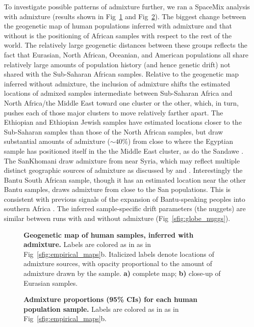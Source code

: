 \documentclass[10pt,letterpaper]{article}
\begin{document}
To investigate possible patterns of admixture further, we ran a SpaceMix analysis with admixture (results shown in Fig\ \ref{sfig:globe_ad_maps} and Fig\ \ref{globe_ad_props}). The biggest change between the geogenetic map of human populations inferred with admixture and that without is the positioning of African samples with respect to the rest of the world.  The relatively large geogenetic distances between these groups reflects the fact that Eurasian, North African, Oceanian, and American populations all share relatively large amounts of population history (and hence genetic drift) not shared with the Sub-Saharan African samples. Relative to the geogenetic map inferred without admixture, the inclusion of admixture shifts the estimated locations of admixed samples intermediate between Sub-Saharan Africa and North Africa/the Middle East toward one cluster or the other, which, in turn, pushes each of those major clusters to move relatively farther apart.  The Ethiopian and Ethiopian Jewish samples have estimated locations closer to the Sub-Saharan samples than those of the North African samples, but draw substantial amounts of admixture ($\sim 40\%$) from close to where the Egyptian sample has positioned itself in the the Middle East cluster, as do the Sandawe \cite{hodgson_early_2014,Pickrell:12}. 
The SanKhomani draw admixture from near Syria, which may reflect multiple distinct geographic sources of admixture as discussed by \cite{Hellenthal} and \cite{Pickrell:14}. 
Interestingly the Bantu South African sample, though it has an estimated location near the other Bantu samples, draws admixture from close to the San populations. This is consistent with previous signals of the expansion of Bantu-speaking peoples into southern Africa  \cite{Pickrell:12,Jakobsson_genomic_2012,Pickrell:14,Hellenthal}.  The inferred sample-specific drift parameters (the nuggets) are similar between runs with and without admixture (Fig\ \ref{sfig:globe_nuggs}).
%
\begin{figure}[ht!]
\begin{center}
\end{center}
\caption{
\textbf{Geogenetic map of human samples, inferred with admixture.} 
Labels are colored as in as in Fig\ \ref{sfig:empirical_maps}b.
Italicized labels denote locations of admixture sources, 
with opacity proportional to the amount of admixture drawn by the sample.
	\textbf{a)} complete map; 
	\textbf{b)} close-up of Eurasian samples.
}\label{sfig:globe_ad_maps}
\end{figure}
%
\begin{figure}[ht!]
\begin{center}
\end{center}
\caption{
\textbf{Admixture proportions (95\% CIs) for each human population sample.}
Labels are colored as in as in Fig\ \ref{sfig:empirical_maps}b.
}\label{globe_ad_props}
\end{figure}
\end{document}
